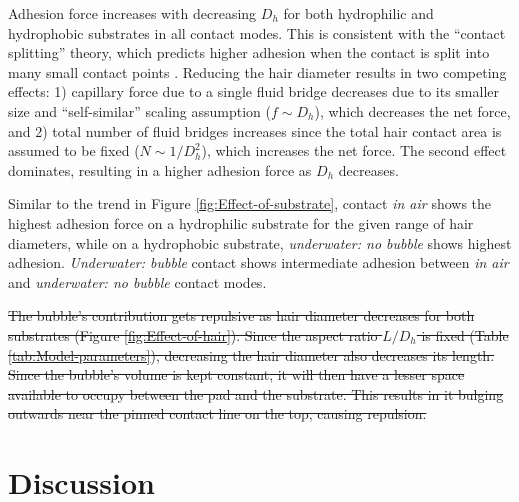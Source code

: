 \documentclass[vruler,JEB]{COB}%
\providecommand{\DIFdel}[1]{{\protect\color{red}\sout{#1}}}                      %
\providecommand{\DIFdelbegin}{} %
\providecommand{\DIFdelend}{} %
\begin{document}
Adhesion force increases with decreasing $D_{h}$ for both hydrophilic
and hydrophobic substrates in all contact modes. This is consistent
with the ``contact splitting'' theory, which predicts higher adhesion
when the contact is split into many small contact points \citep{RN24}.
Reducing the hair diameter results in two competing effects: 1) capillary
force due to a single fluid bridge decreases due to its smaller size
and ``self-similar'' scaling assumption ($f\sim D_{h}$), which
decreases the net force, and 2) total number of fluid bridges increases
since the total hair contact area is assumed to be fixed ($N\sim1/D_{h}^{2}$),
which increases the net force. The second effect dominates, resulting
in a higher adhesion force as $D_{h}$ decreases. 

Similar to the trend in Figure \ref{fig:Effect-of-substrate}, contact
\emph{in air} shows the highest adhesion force on a hydrophilic substrate
for the given range of hair diameters, while on a hydrophobic substrate,
\emph{underwater: no bubble} shows highest adhesion. \emph{Underwater:
bubble} contact shows intermediate adhesion between \emph{in air}
and \emph{underwater: no bubble} contact modes.

\DIFdelbegin \DIFdel{The bubble's contribution gets repulsive as hair diameter decreases
for both substrates (Figure \ref{fig:Effect-of-hair}). Since the
aspect ratio $L/D_{h}$ is fixed (Table \ref{tab:Model-parameters}),
decreasing the hair diameter also decreases its length. Since the
bubble's volume is kept constant, it will then have a lesser space
available to occupy between the pad and the substrate. This results
in it bulging outwards near the pinned contact line on the top, causing
repulsion.
}\DIFdelend %

\section{Discussion}
\end{document}

